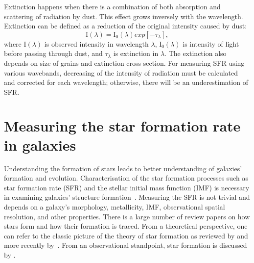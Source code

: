 Extinction happens when there is a combination of both absorption and scattering of radiation by dust.
This effect grows inversely with the wavelength.
Extinction can be defined as a reduction of the original intensity caused by dust:
\begin{equation}
\label{equ: extinction}
{\mathrm I}(\lambda) = {\mathrm I}_0(\lambda)exp[-\tau_{\lambda}],
\end{equation}
where I$(\lambda)$ is observed intensity in wavelength $\lambda$, I$_0(\lambda)$ is intensity of light before passing through dust, and $\tau_{\lambda}$ is extinction in $\lambda$.
The extinction also depends on size of grains and extinction cross section.
For measuring SFR using various wavebands, decreasing of the intensity of radiation must be calculated and corrected for each wavelength; otherwise, there will be an underestimation of SFR. 


\section{Measuring the star formation rate in galaxies} 
\label{sec: sfr_intro}
Understanding the formation of stars leads to better understanding of galaxies' formation and evolution. 
Characterisation of the star formation processes such as star formation rate (SFR) and the stellar initial mass function (IMF) is necessary in examining galaxies' structure formation~\citep{McKee07}. 
Measuring the SFR is not trivial and depends on a galaxy's morphology, metallicity, IMF, observational spatial resolution, and other properties. 
There is a large number of review papers on how stars form and how their formation is traced. 
From a theoretical perspective, one can refer to the classic picture of the theory of star formation as reviewed by \cite{Shu87} and more recently by~\citep{McKee07}. 
From an observational standpoint, star formation is discussed by \cite[][and references therein]{Kennicutt98b, Kewley02, Calzetti13, Boquien10, Kennicutt12}.

